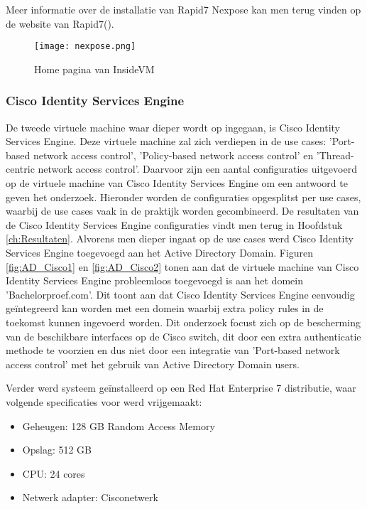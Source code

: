 Meer informatie over de installatie van Rapid7 Nexpose kan men terug vinden op de website van Rapid7(\cite{rapid7}).

\begin{figure}[H]
	\centering
	\texttt{[image: nexpose.png]}
	\caption{Home pagina van InsideVM}%
	\label{fig:nexpose}%
\end{figure}
\newpage
\subsubsection{Cisco Identity Services Engine}
De tweede virtuele machine waar dieper wordt op ingegaan, is Cisco Identity Services Engine. Deze virtuele machine zal zich verdiepen in de use cases: 'Port-based network access control', 'Policy-based network access control' en 'Thread-centric network access control'. Daarvoor zijn een aantal configuraties uitgevoerd op de virtuele machine van Cisco Identity Services Engine om een antwoord te geven het onderzoek. Hieronder worden de configuraties opgesplitst per use cases, waarbij de use cases vaak in de praktijk worden gecombineerd. De resultaten van de Cisco Identity Services Engine configuraties vindt men terug in Hoofdstuk \ref{ch:Resultaten}.
\newline
\newline
Alvorens men dieper ingaat op de use cases werd Cisco Identity Services Engine toegevoegd aan het Active Directory Domain. Figuren \ref{fig:AD_Cisco1} en \ref{fig:AD_Cisco2} tonen aan dat de virtuele machine van Cisco Identity Services Engine probleemloos toegevoegd is aan het domein 'Bachelorproef.com'. Dit toont aan dat Cisco Identity Services Engine eenvoudig geïntegreerd kan worden met een domein waarbij extra policy rules  in de toekomst kunnen ingevoerd worden. Dit onderzoek focust zich op de bescherming van de beschikbare interfaces op de Cisco switch, dit door een extra authenticatie methode te voorzien en dus niet door een integratie van 'Port-based network access control' met het gebruik van Active Directory Domain users.

Verder werd systeem geïnstalleerd op een Red Hat Enterprise 7 distributie, waar volgende specificaties voor werd vrijgemaakt: 

\begin{itemize}
	\item Geheugen: 128 GB Random Access Memory
	\item Opslag: 512 GB
	\item CPU: 24 cores
	\item Netwerk adapter: Cisco\textunderscore netwerk
\end{itemize}

